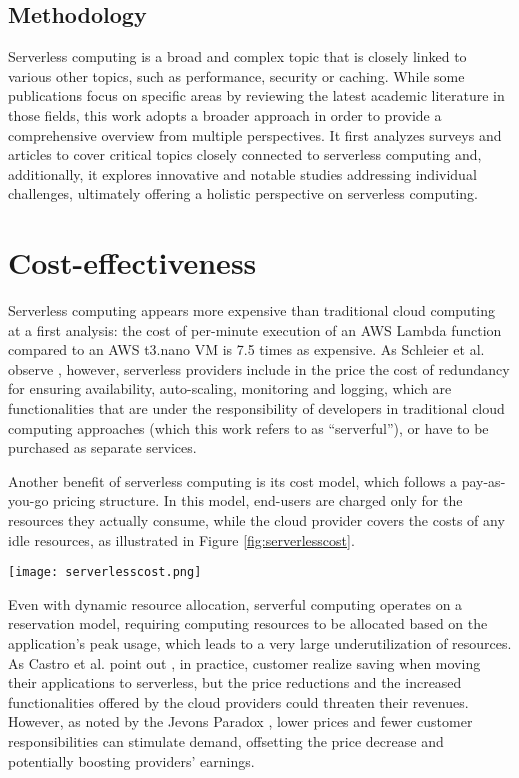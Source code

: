 \documentclass[
	a4paper, %
	12pt,
	twoside, %
]{LTJournalArticle}
\begin{document}
\subsection{Methodology}
Serverless computing is a broad and complex topic that is closely linked to various other topics, such as performance, security or caching. While some publications focus on specific areas by reviewing the latest academic literature in those fields, this work adopts a broader approach in order to provide a comprehensive overview from multiple perspectives. It first analyzes surveys and articles to cover critical topics closely connected to serverless computing and, additionally, it explores innovative and notable studies addressing individual challenges, ultimately offering a holistic perspective on serverless computing.

\section{Cost-effectiveness}
\label{sec:costeffectiveness}
Serverless computing appears more expensive than traditional cloud computing at a first analysis: the cost of per-minute execution of an AWS Lambda function compared to an AWS t3.nano VM is 7.5 times as expensive. As Schleier et al. observe \cite{schleier-smith_what_2021}, however, serverless providers include in the price the cost of redundancy for ensuring availability, auto-scaling, monitoring and logging, which are functionalities that are under the responsibility of developers in traditional cloud computing approaches (which this work refers to as ``serverful''), or have to be purchased as separate services.

Another benefit of serverless computing is its cost model, which follows a pay-as-you-go pricing structure. In this model, end-users are charged only for the resources they actually consume, while the cloud provider covers the costs of any idle resources, as illustrated in Figure \ref{fig:serverlesscost}.

\begin{figure*}
	\texttt{[image: serverlesscost.png]}
	\caption{Advantages of serverless computing's cost model. Source: \cite{schleier-smith_what_2021}}
	\label{fig:serverlesscost}
\end{figure*}

Even with dynamic resource allocation, serverful computing operates on a reservation model, requiring computing resources to be allocated based on the application's peak usage, which leads to a very large underutilization of resources. As Castro et al. point out \cite{schleier-smith_what_2021}, in practice, customer realize saving when moving their applications to serverless, but the price reductions and the increased functionalities offered by the cloud providers could threaten their revenues. 
However, as noted by the Jevons Paradox \cite{alcott_jevons_2005}, lower prices and fewer customer responsibilities can stimulate demand, offsetting the price decrease and potentially boosting providers’ earnings. 
\end{document}
